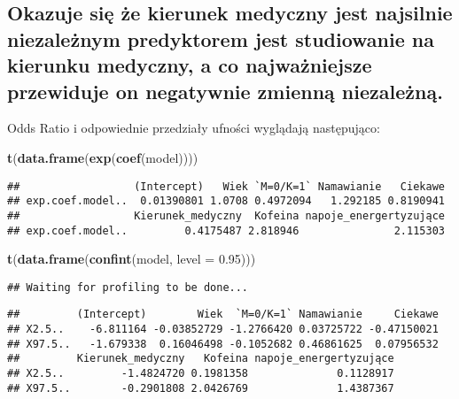 \documentclass[]{article}
\newenvironment{Shaded}{\begin{snugshade}}{\end{snugshade}}
\newcommand{\KeywordTok}[1]{\textcolor[rgb]{0.13,0.29,0.53}{\textbf{#1}}}
\newcommand{\DataTypeTok}[1]{\textcolor[rgb]{0.13,0.29,0.53}{#1}}
\newcommand{\FloatTok}[1]{\textcolor[rgb]{0.00,0.00,0.81}{#1}}
\newcommand{\NormalTok}[1]{#1}
\begin{document}
\subsection{\texorpdfstring{Okazuje się że kierunek medyczny jest
najsilnie niezależnym predyktorem jest studiowanie na kierunku medyczny,
a co najważniejsze \textbf{przewiduje on negatywnie} zmienną
niezależną.}{Okazuje się że kierunek medyczny jest najsilnie niezależnym predyktorem jest studiowanie na kierunku medyczny, a co najważniejsze przewiduje on negatywnie zmienną niezależną.}}\label{okazuje-sie-ze-kierunek-medyczny-jest-najsilnie-niezaleznym-predyktorem-jest-studiowanie-na-kierunku-medyczny-a-co-najwazniejsze-przewiduje-on-negatywnie-zmienna-niezalezna.}

Odds Ratio i odpowiednie przedziały ufności wyglądają następująco:

\begin{Shaded}
\begin{Highlighting}[]
\KeywordTok{t}\NormalTok{(}\KeywordTok{data.frame}\NormalTok{(}\KeywordTok{exp}\NormalTok{(}\KeywordTok{coef}\NormalTok{(model))))}
\end{Highlighting}
\end{Shaded}

\begin{verbatim}
##                  (Intercept)   Wiek `M=0/K=1` Namawianie   Ciekawe
## exp.coef.model..  0.01390801 1.0708 0.4972094   1.292185 0.8190941
##                  Kierunek_medyczny  Kofeina napoje_energertyzujące
## exp.coef.model..         0.4175487 2.818946               2.115303
\end{verbatim}

\begin{Shaded}
\begin{Highlighting}[]
\KeywordTok{t}\NormalTok{(}\KeywordTok{data.frame}\NormalTok{(}\KeywordTok{confint}\NormalTok{(model, }\DataTypeTok{level =} \FloatTok{0.95}\NormalTok{)))}
\end{Highlighting}
\end{Shaded}

\begin{verbatim}
## Waiting for profiling to be done...
\end{verbatim}

\begin{verbatim}
##         (Intercept)        Wiek  `M=0/K=1` Namawianie     Ciekawe
## X2.5..    -6.811164 -0.03852729 -1.2766420 0.03725722 -0.47150021
## X97.5..   -1.679338  0.16046498 -0.1052682 0.46861625  0.07956532
##         Kierunek_medyczny   Kofeina napoje_energertyzujące
## X2.5..         -1.4824720 0.1981358              0.1128917
## X97.5..        -0.2901808 2.0426769              1.4387367
\end{verbatim}
\end{document}
